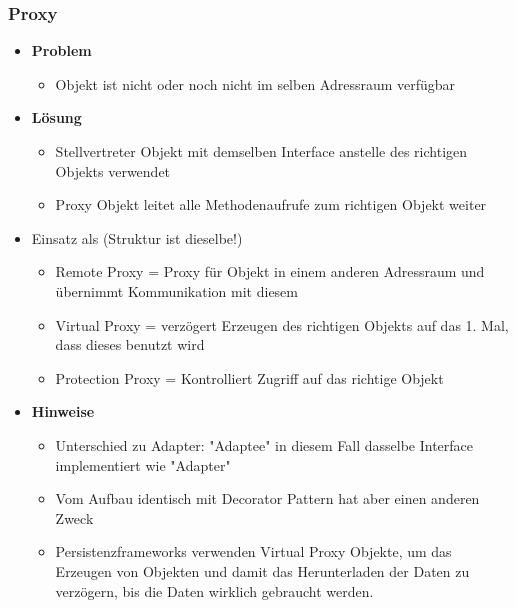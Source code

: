 \documentclass[../ZF_SWEN1.tex]{subfiles}
\begin{document}
\subsubsection{Proxy}
\begin{itemize}
	\item \textbf{Problem}
	\begin{itemize}
		\item Objekt ist nicht oder noch nicht im selben Adressraum verfügbar
	\end{itemize}
	\item \textbf{Lösung}
	\begin{itemize}
		\item Stellvertreter Objekt mit demselben Interface anstelle des richtigen Objekts verwendet
		\item Proxy Objekt leitet alle Methodenaufrufe zum richtigen Objekt weiter
	\end{itemize}
	\item Einsatz als (Struktur ist dieselbe!)
	\begin{itemize}
		\item Remote Proxy = Proxy für Objekt in einem anderen Adressraum und übernimmt Kommunikation mit diesem
		\item Virtual Proxy = verzögert Erzeugen des richtigen Objekts auf das 1. Mal, dass dieses benutzt wird
		\item Protection Proxy = Kontrolliert Zugriff auf das richtige Objekt
	\end{itemize}
	\item \textbf{Hinweise}
	\begin{itemize}
		\item Unterschied zu Adapter: "Adaptee" in diesem Fall dasselbe Interface implementiert wie "Adapter"
		\item Vom Aufbau identisch mit Decorator Pattern hat aber einen anderen Zweck
		\item Persistenzframeworks verwenden Virtual Proxy Objekte, um das Erzeugen von Objekten und damit das Herunterladen der Daten zu verzögern, bis die Daten wirklich gebraucht werden.
	\end{itemize}
\end{itemize}
\end{document}
